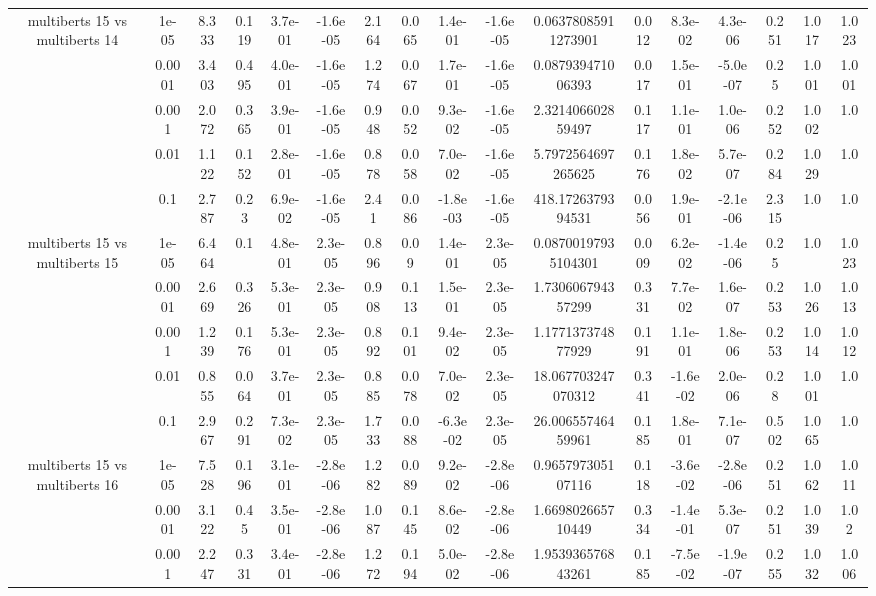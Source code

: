 \begin{tabular}{|c|c|c|c|c|c|c|c|c|c|c|c|c|c|c|c|c|}
\hline
\multirow{5}{*}{multiberts 15 vs multiberts 14} & 1e-05 & 8.333 & 0.119 & 3.7e-01 & -1.6e-05 & 2.164 & 0.065 & 1.4e-01 & -1.6e-05 & 0.06378085911273901 & 0.012 & 8.3e-02 & 4.3e-06 & 0.251 & 1.017 & 1.023 \\
 & 0.0001 & 3.403 & 0.495 & 4.0e-01 & -1.6e-05 & 1.274 & 0.067 & 1.7e-01 & -1.6e-05 & 0.087939471006393 & 0.017 & 1.5e-01 & -5.0e-07 & 0.25 & 1.001 & 1.001 \\
 & 0.001 & 2.072 & 0.365 & 3.9e-01 & -1.6e-05 & 0.948 & 0.052 & 9.3e-02 & -1.6e-05 & 2.321406602859497 & 0.117 & 1.1e-01 & 1.0e-06 & 0.252 & 1.002 & 1.0 \\
 & 0.01 & 1.122 & 0.152 & 2.8e-01 & -1.6e-05 & 0.878 & 0.058 & 7.0e-02 & -1.6e-05 & 5.7972564697265625 & 0.176 & 1.8e-02 & 5.7e-07 & 0.284 & 1.029 & 1.0 \\
 & 0.1 & 2.787 & 0.23 & 6.9e-02 & -1.6e-05 & 2.41 & 0.086 & -1.8e-03 & -1.6e-05 & 418.1726379394531 & 0.056 & 1.9e-01 & -2.1e-06 & 2.315 & 1.0 & 1.0 \\
\hline
\multirow{5}{*}{multiberts 15 vs multiberts 15} & 1e-05 & 6.464 & 0.1 & 4.8e-01 & 2.3e-05 & 0.896 & 0.09 & 1.4e-01 & 2.3e-05 & 0.08700197935104301 & 0.009 & 6.2e-02 & -1.4e-06 & 0.25 & 1.0 & 1.023 \\
 & 0.0001 & 2.669 & 0.326 & 5.3e-01 & 2.3e-05 & 0.908 & 0.113 & 1.5e-01 & 2.3e-05 & 1.730606794357299 & 0.331 & 7.7e-02 & 1.6e-07 & 0.253 & 1.026 & 1.013 \\
 & 0.001 & 1.239 & 0.176 & 5.3e-01 & 2.3e-05 & 0.892 & 0.101 & 9.4e-02 & 2.3e-05 & 1.177137374877929 & 0.191 & 1.1e-01 & 1.8e-06 & 0.253 & 1.014 & 1.012 \\
 & 0.01 & 0.855 & 0.064 & 3.7e-01 & 2.3e-05 & 0.885 & 0.078 & 7.0e-02 & 2.3e-05 & 18.067703247070312 & 0.341 & -1.6e-02 & 2.0e-06 & 0.28 & 1.001 & 1.0 \\
 & 0.1 & 2.967 & 0.291 & 7.3e-02 & 2.3e-05 & 1.733 & 0.088 & -6.3e-02 & 2.3e-05 & 26.00655746459961 & 0.185 & 1.8e-01 & 7.1e-07 & 0.502 & 1.065 & 1.0 \\
\hline
\multirow{5}{*}{multiberts 15 vs multiberts 16} & 1e-05 & 7.528 & 0.196 & 3.1e-01 & -2.8e-06 & 1.282 & 0.089 & 9.2e-02 & -2.8e-06 & 0.965797305107116 & 0.118 & -3.6e-02 & -2.8e-06 & 0.251 & 1.062 & 1.011 \\
 & 0.0001 & 3.122 & 0.45 & 3.5e-01 & -2.8e-06 & 1.087 & 0.145 & 8.6e-02 & -2.8e-06 & 1.669802665710449 & 0.334 & -1.4e-01 & 5.3e-07 & 0.251 & 1.039 & 1.02 \\
 & 0.001 & 2.247 & 0.331 & 3.4e-01 & -2.8e-06 & 1.272 & 0.194 & 5.0e-02 & -2.8e-06 & 1.953936576843261 & 0.185 & -7.5e-02 & -1.9e-07 & 0.255 & 1.032 & 1.006 \\

\end{tabular}
